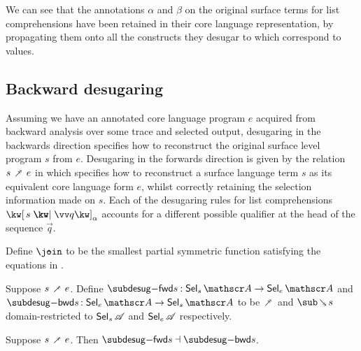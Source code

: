 \noindent
We can see that the annotations $\alpha$ and $\beta$ on the original surface terms for list comprehensions have been retained in their core language representation, by propagating them onto all the constructs they desugar to which correspond to values.

\subsection{Backward desugaring}

Assuming we have an annotated core language program $e$ acquired from backward analysis over some trace and selected output, desugaring in the backwards direction specifies how to reconstruct the original surface level program $s$ from $e$.
Desugaring in the forwards direction is given by the relation $s \desugarFwdR e$ in  which specifies how to reconstruct a surface language term $s$ as its equivalent core language form $e$, whilst correctly retaining the selection information made on $s$. Each of the desugaring rules for list comprehensions $\annListComp{s}{\vec{q}}{\alpha}$ accounts for a different possible qualifier at the head of the sequence $\vec{q}$.


\begin{definition}
   Define $\disjjoin$ to be the smallest partial symmetric function satisfying the equations in .
\end{definition}

\begin{definition}
     Suppose $s \desugarFwdR e$. Define $\desugarFwdF{s}: \Below{s} \to \Below{e}$ and $\desugarBwdF{s}: \Below{e} \to \Below{s}$ to be $\desugarFwdR$ and $\desugarBwdR{s}$ domain-restricted to $\textup{\textsf{Sel}}_{s}\,{\mathscr{A}}$ and $\textup{\textsf{Sel}}_{e}\,{\mathscr{A}}$ respectively.
\end{definition}

\begin{theorem}
  \label{thm:surface-language:desugar:gc}
     Suppose $s \desugarFwdR e$. Then $\desugarFwdF{s} \adjoint \desugarBwdF{s}$.
\end{theorem}

